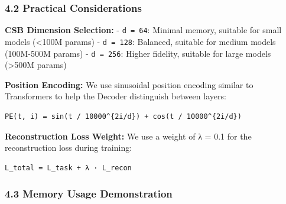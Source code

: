 \documentclass[
  11pt,
  a4paper,
]{article}
\begin{document}
\subsubsection{4.2 Practical
Considerations}\label{practical-considerations}

\textbf{CSB Dimension Selection:} - \texttt{d\ =\ 64}: Minimal memory,
suitable for small models (\textless100M params) - \texttt{d\ =\ 128}:
Balanced, suitable for medium models (100M-500M params) -
\texttt{d\ =\ 256}: Higher fidelity, suitable for large models
(\textgreater500M params)

\textbf{Position Encoding:} We use sinusoidal position encoding similar
to Transformers to help the Decoder distinguish between layers:

\begin{verbatim}
PE(t, i) = sin(t / 10000^{2i/d}) + cos(t / 10000^{2i/d})
\end{verbatim}

\textbf{Reconstruction Loss Weight:} We use a weight of λ = 0.1 for the
reconstruction loss during training:

\begin{verbatim}
L_total = L_task + λ · L_recon
\end{verbatim}

\subsubsection{4.3 Memory Usage
Demonstration}\label{memory-usage-demonstration}
\end{document}
